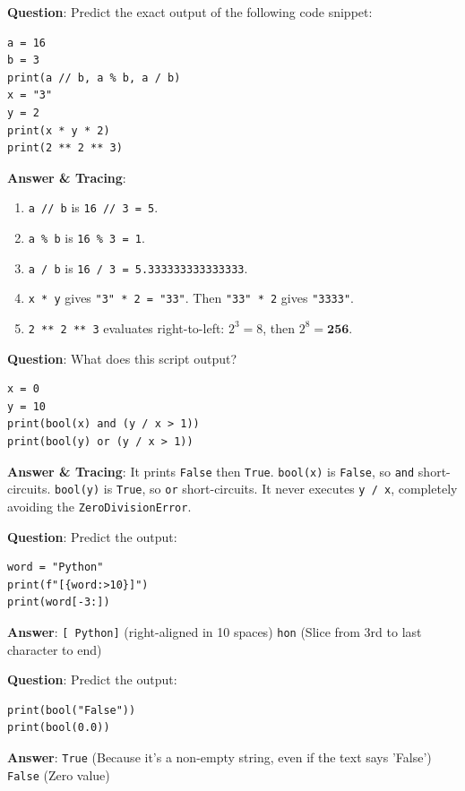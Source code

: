 \begin{outputprediction}
\textbf{Question}: Predict the exact output of the following code snippet:
\begin{lstlisting}[language=Python3]
a = 16
b = 3
print(a // b, a % b, a / b)
x = "3"
y = 2
print(x * y * 2)
print(2 ** 2 ** 3)
\end{lstlisting}
\textbf{Answer \& Tracing}:
\begin{enumerate}
    \item \texttt{a // b} is \texttt{16 // 3 = 5}.
    \item \texttt{a \% b} is \texttt{16 \% 3 = 1}.
    \item \texttt{a / b} is \texttt{16 / 3 = 5.333333333333333}.
    \item \texttt{x * y} gives \texttt{"3" * 2 = "33"}. Then \texttt{"33" * 2} gives \texttt{"3333"}.
    \item \texttt{2 ** 2 ** 3} evaluates right-to-left: $2^3 = 8$, then $2^8 = \mathbf{256}$.
\end{enumerate}
\end{outputprediction}

\begin{outputprediction}
\textbf{Question}: What does this script output?
\begin{lstlisting}[language=Python3]
x = 0
y = 10
print(bool(x) and (y / x > 1))
print(bool(y) or (y / x > 1))
\end{lstlisting}
\textbf{Answer \& Tracing}:
It prints \texttt{False} then \texttt{True}. \texttt{bool(x)} is \texttt{False}, so \texttt{and} short-circuits. \texttt{bool(y)} is \texttt{True}, so \texttt{or} short-circuits. It never executes \texttt{y / x}, completely avoiding the \texttt{ZeroDivisionError}.
\end{outputprediction}

\begin{outputprediction}
\textbf{Question}: Predict the output:
\begin{lstlisting}[language=Python3]
word = "Python"
print(f"[{word:>10}]")
print(word[-3:])
\end{lstlisting}
\textbf{Answer}:
\texttt{[    Python]} (right-aligned in 10 spaces)
\texttt{hon} (Slice from 3rd to last character to end)
\end{outputprediction}

\begin{outputprediction}
\textbf{Question}: Predict the output:
\begin{lstlisting}[language=Python3]
print(bool("False"))
print(bool(0.0))
\end{lstlisting}
\textbf{Answer}:
\texttt{True} (Because it's a non-empty string, even if the text says 'False')
\texttt{False} (Zero value)
\end{outputprediction}

